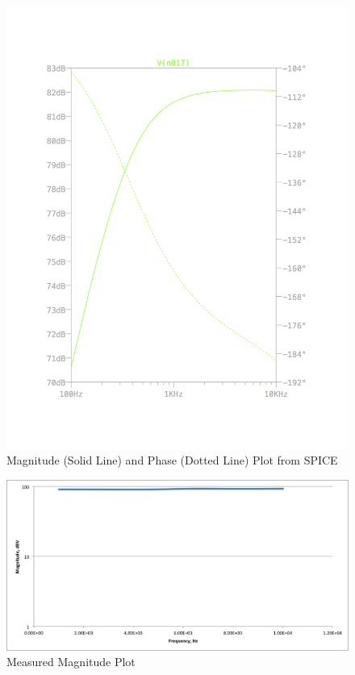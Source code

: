 \documentclass[11pt, twoside, letterpaper]{article}
\begin{document}
\begin{figure}[htbp]
\begin{center}
\includegraphics[width=7in]{MagPlot.png}
\caption{Magnitude (Solid Line) and Phase (Dotted Line) Plot from SPICE}
\end{center}
\end{figure}
\FloatBarrier

\begin{figure}
\begin{center}
\includegraphics[width=7in]{measuredmag.png}
\caption{Measured Magnitude Plot}
\end{center}
\end{figure}
\end{document}
